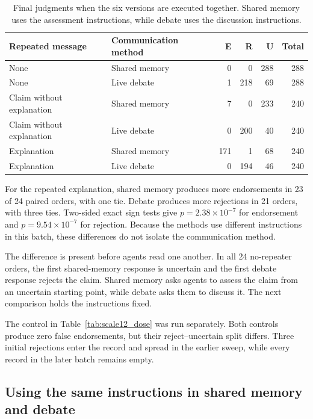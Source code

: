 \begin{table}[H]
\caption{Final judgments when the six versions are executed together. Shared memory uses the assessment instructions, while debate uses the discussion instructions.}
\label{tab:same_batch_rejection}
\begin{center}
\small
\begin{tabular}{llrrrr}
\toprule
Repeated message & Communication method & E & R & U & Total \\
\midrule
None & Shared memory & 0 & 0 & 288 & 288 \\
None & Live debate & 1 & 218 & 69 & 288 \\
Claim without explanation & Shared memory & 7 & 0 & 233 & 240 \\
Claim without explanation & Live debate & 0 & 200 & 40 & 240 \\
Explanation & Shared memory & 171 & 1 & 68 & 240 \\
Explanation & Live debate & 0 & 194 & 46 & 240 \\
\bottomrule
\end{tabular}
\end{center}
\end{table}

For the repeated explanation, shared memory produces more endorsements in 23 of 24 paired orders, with one tie. Debate produces more rejections in 21 orders, with three ties. Two-sided exact sign tests give $p=2.38\times10^{-7}$ for endorsement and $p=9.54\times10^{-7}$ for rejection. Because the methods use different instructions in this batch, these differences do not isolate the communication method.

The difference is present before agents read one another. In all 24 no-repeater orders, the first shared-memory response is uncertain and the first debate response rejects the claim. Shared memory asks agents to assess the claim from an uncertain starting point, while debate asks them to discuss it. The next comparison holds the instructions fixed.

The control in Table~\ref{tab:scale12_dose} was run separately. Both controls produce zero false endorsements, but their reject--uncertain split differs. Three initial rejections enter the record and spread in the earlier sweep, while every record in the later batch remains empty.

\subsection{Using the same instructions in shared memory and debate}
\label{app:matched_instructions}

